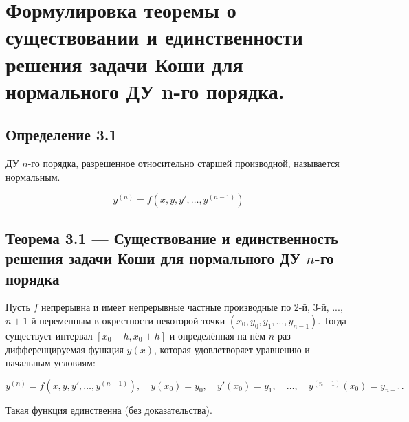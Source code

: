 {
	\section{Формулировка теоремы о существовании и единственности решения задачи Коши для нормального ДУ n-го
	порядка.}

	\subsection*{Определение 3.1}

	ДУ \( n \)-го порядка, разрешенное относительно старшей производной, называется нормальным.



	\[
	y^{(n)} = f(x, y, y', \ldots, y^{(n-1)})
	\]

	\subsection*{Теорема 3.1 — Существование и единственность решения задачи Коши для нормального ДУ \( n \)-го порядка}

	Пусть \( f \) непрерывна и имеет непрерывные частные производные по 2-й, 3-й, ..., \( n+1 \)-й переменным в окрестности некоторой точки \( (x_0, y_0, y_1, \ldots, y_{n-1}) \). Тогда существует интервал \( [x_0 - h, x_0 + h] \) и определённая на нём \( n \) раз дифференцируемая функция \( y(x) \), которая удовлетворяет уравнению и начальным условиям:



	\[
	y^{(n)} = f(x, y, y', \ldots, y^{(n-1)}), \quad y(x_0) = y_0, \quad y'(x_0) = y_1, \quad \ldots, \quad y^{(n-1)}(x_0) = y_{n-1}.
	\]



Такая функция единственна (без доказательства).



	\newpage
}